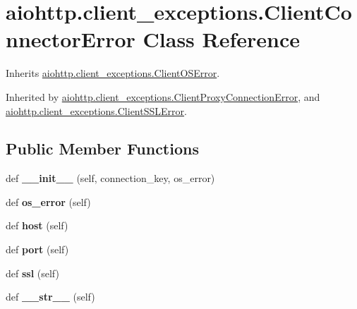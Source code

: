 \hypertarget{classaiohttp_1_1client__exceptions_1_1_client_connector_error}{}\section{aiohttp.\+client\+\_\+exceptions.\+Client\+Connector\+Error Class Reference}
\label{classaiohttp_1_1client__exceptions_1_1_client_connector_error}


Inherits \hyperlink{classaiohttp_1_1client__exceptions_1_1_client_o_s_error}{aiohttp.\+client\+\_\+exceptions.\+Client\+O\+S\+Error}.



Inherited by \hyperlink{classaiohttp_1_1client__exceptions_1_1_client_proxy_connection_error}{aiohttp.\+client\+\_\+exceptions.\+Client\+Proxy\+Connection\+Error}, and \hyperlink{classaiohttp_1_1client__exceptions_1_1_client_s_s_l_error}{aiohttp.\+client\+\_\+exceptions.\+Client\+S\+S\+L\+Error}.

\subsection*{Public Member Functions}
\begin{DoxyCompactItemize}
\item 
\mbox{\label{classaiohttp_1_1client__exceptions_1_1_client_connector_error_a95aacf88f27b151d7e2349292073c369}} 
def {\bfseries \+\_\+\+\_\+init\+\_\+\+\_\+} (self, connection\+\_\+key, os\+\_\+error)
\item 
\mbox{\label{classaiohttp_1_1client__exceptions_1_1_client_connector_error_afe7beac0bdf70af42ed88364261fc147}} 
def {\bfseries os\+\_\+error} (self)
\item 
\mbox{\label{classaiohttp_1_1client__exceptions_1_1_client_connector_error_a08488cd4dd298f3fd3ba635b52bd4550}} 
def {\bfseries host} (self)
\item 
\mbox{\label{classaiohttp_1_1client__exceptions_1_1_client_connector_error_a02b3f2dcb48e415287362a9b4025bac9}} 
def {\bfseries port} (self)
\item 
\mbox{\label{classaiohttp_1_1client__exceptions_1_1_client_connector_error_a85cc02e6994b7ae692ce63b14df4ada3}} 
def {\bfseries ssl} (self)
\item 
\mbox{\label{classaiohttp_1_1client__exceptions_1_1_client_connector_error_a5515da12c582764a9a919a99b6b3858a}} 
def {\bfseries \+\_\+\+\_\+str\+\_\+\+\_\+} (self)
\end{DoxyCompactItemize}


